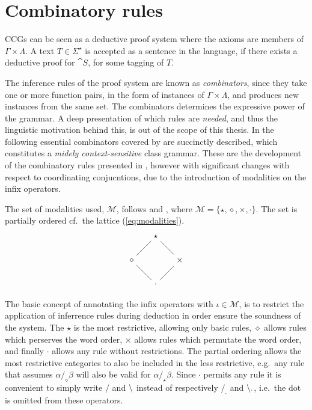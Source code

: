 \section{Combinatory rules}
CCGs can be seen as a deductive proof system where the axioms are members of $\Gamma \times \Lambda$. A text $T \in \Sigma^\star$ is accepted as a sentence in the language, if there exists a deductive proof for $\cat{S}$, for some tagging of $T$.

The inference rules of the proof system are known as \emph{combinators}, since they take one or more function pairs, in the form of instances of $\Gamma \times \Lambda$, and produces new instances from the same set. The combinators determines the expressive power of the grammar. A deep presentation of which rules are \emph{needed}, and thus the linguistic motivation behind this, is out of the scope of this thesis. In the following essential combinators covered by \citeauthor{ts}  are succinctly described, which constitutes a \emph{midely context-sensitive} class grammar. These are the development of the combinatory rules \citeauthor{sp} presented in , however with significant changes with respect to coordinating conjucntions, due to the introduction of modalities on the infix operators. 

The set of modalities used, $\mathcal{M}$, follows \cite{multiModalCCG} and \cite{ts}, where $\mathcal{M} = \{ \star, \diamond, \times, \cdot \}$. The set is partially ordered cf.\ the lattice (\ref{eq:modalities}).
\begin{equation}  
  \begin{tikzpicture}
    \tikzstyle{all nodes}=[inner sep=4pt]
    \draw node(*)at(0,1){$\star$}
          node(D)at(-1,0){$\diamond$}                    
          node(X)at(1,0){$\times$}
          node(d)at(0,-1){$\cdot$};
    \draw(*)--(D);
    \draw(*)--(X);
    \draw(D)--(d);
    \draw(X)--(d);
  \end{tikzpicture}
  \label{eq:modalities}
\end{equation}

The basic concept of annotating the infix operators with $\iota \in \mathcal{M}$, is to restrict the application of inferrence rules during deduction in order ensure the soundness of the system. The $\star$ is the most restrictive, allowing only basic rules, $\diamond$ allows rules which perserves the word order, $\times$ allows rules which permutate the word order, and finally $\cdot$ allows any rule without restrictions. The partial ordering allows the most restrictive categories to also be included in the less restrictive, e.g.\ any rule that assumes $\alpha /_\diamond \beta$ will also be valid for $\alpha /_\star \beta$. Since $\cdot$ permits any rule it is convenient to simply write $/$ and $\backslash$ instead of respectively $/_\cdot$ and $\backslash_\cdot$, i.e.\ the dot is omitted from these operators.

